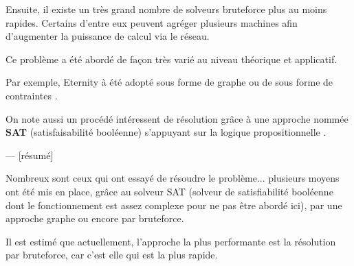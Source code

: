 	Ensuite, il existe un très grand nombre de solveurs bruteforce plus au moins rapides. Certains d'entre eux peuvent agréger plusieurs machines afin d'augmenter la puissance de calcul via le réseau.
	
	Ce problème a été abordé de façon très varié au niveau théorique et applicatif.
	
	Par exemple, Eternity à été adopté sous forme de graphe \cite{patey2010eternity} ou de sous forme de contraintes \cite{benoist2008programmation}.
	
	On note aussi un procédé intéressent de résolution grâce à une approche nommée \textbf{SAT} (satisfaisabilité booléenne) s'appuyant sur la logique propositionnelle \cite{cuvillierresolution} \cite{heule2009solving}.
	
	--- [résumé]
	
	Nombreux sont ceux qui ont essayé de résoudre le problème... plusieurs moyens ont été mis en place, grâce au solveur SAT (solveur de satisfiabilité booléenne dont le fonctionnement est assez complexe pour ne pas être abordé ici), par une approche graphe ou encore par bruteforce.
	
	Il est estimé que actuellement, l'approche la plus performante est la résolution par bruteforce, car c'est elle qui est la plus rapide.